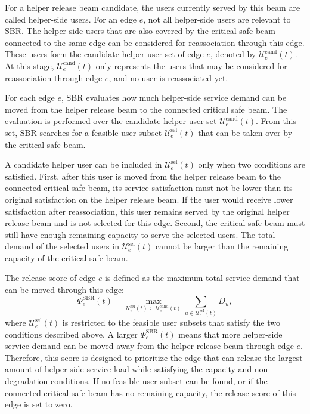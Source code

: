 \setcounter{subsubsection}{0}
For a helper release beam candidate, the users currently served by this beam are called helper-side users. For an edge $e$, not all helper-side users are relevant to SBR. The helper-side users that are also covered by the critical safe beam connected to the same edge can be considered for reassociation through this edge. These users form the candidate helper-user set of edge $e$, denoted by $\mathcal{U}_e^{\mathrm{cand}}(t)$. At this stage, $\mathcal{U}_e^{\mathrm{cand}}(t)$ only represents the users that may be considered for reassociation through edge $e$, and no user is reassociated yet.

For each edge $e$, SBR evaluates how much helper-side service demand can be moved from the helper release beam to the connected critical safe beam. The evaluation is performed over the candidate helper-user set $\mathcal{U}_e^{\mathrm{cand}}(t)$. From this set, SBR searches for a feasible user subset $\mathcal{U}_e^{\mathrm{sel}}(t)$ that can be taken over by the critical safe beam.

A candidate helper user can be included in $\mathcal{U}_e^{\mathrm{sel}}(t)$ only when two conditions are satisfied. First, after this user is moved from the helper release beam to the connected critical safe beam, its service satisfaction must not be lower than its original satisfaction on the helper release beam. If the user would receive lower satisfaction after reassociation, this user remains served by the original helper release beam and is not selected for this edge. Second, the critical safe beam must still have enough remaining capacity to serve the selected users. The total demand of the selected users in $\mathcal{U}_e^{\mathrm{sel}}(t)$ cannot be larger than the remaining capacity of the critical safe beam.

The release score of edge $e$ is defined as the maximum total service demand that can be moved through this edge:
\begin{equation}
\label{eq:ch4_sbr_score}
\Phi_e^{\mathrm{SBR}}(t)=
\max_{\mathcal{U}_e^{\mathrm{sel}}(t)\subseteq \mathcal{U}_e^{\mathrm{cand}}(t)}
\sum_{u\in \mathcal{U}_e^{\mathrm{sel}}(t)} D_u,
\tag{10}
\end{equation}
where $\mathcal{U}_e^{\mathrm{sel}}(t)$ is restricted to the feasible user subsets that satisfy the two conditions described above. A larger $\Phi_e^{\mathrm{SBR}}(t)$ means that more helper-side service demand can be moved away from the helper release beam through edge $e$. Therefore, this score is designed to prioritize the edge that can release the largest amount of helper-side service load while satisfying the capacity and non-degradation conditions. If no feasible user subset can be found, or if the connected critical safe beam has no remaining capacity, the release score of this edge is set to zero.

